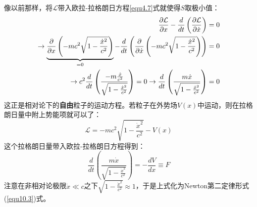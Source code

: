 像以前那样，将$\mathcal{L}$带入欧拉-拉格朗日方程\ref{equ4.7}式就使得$S$取极小值：
\begin{align}
    \frac{\partial \mathcal{L}}{\partial x} - \frac{d}{dt} \left( \frac{\partial \mathcal{L}}{\partial \dot{x}} \right) &= 0 \notag \\
    \to \underbrace{ \frac{\partial}{\partial x} \left( -mc^2 \sqrt{1 - \frac{\dot{x}^2}{c^2}} \right) }_{ = 0} - \frac{d}{dt} \left( \frac{\partial}{\partial \dot{x}} \left( -mc^2 \sqrt{1 - \frac{ \dot{x}^2}{c^2} } \right) \right) &= 0 \notag \\
\label{equ10.9}
    \to c^2 \frac{d}{dt} \left( \frac{ -m \frac{\dot{x}}{c^2} }{\sqrt{1 - \frac{ \dot{x}^2}{c^2} } } \right) = 0 \rightarrow \frac{d}{dt} \left( \frac{m \dot{x}}{\sqrt{1 - \frac{\dot{x}^2}{c^2}}} \right) &= 0
\end{align}
这正是相对论下的{\bf 自由}粒子的运动方程。若粒子在外势场$V(x)$中运动，则在拉格朗日量中附上势能项就可以了：
\begin{equation}
\label{equ10.10}
    \mathcal{L} = -mc^2 \sqrt{1 - \frac{\dot{x}^2}{c^2} } - V(x)
\end{equation}
这个拉格朗日量带入欧拉-拉格朗日方程得到：
\begin{equation}
\label{equ10.11}
    \frac{d}{dt} \left( \frac{m \dot{x}}{ \sqrt{1 - \frac{\dot{x}^2}{c^2} } } \right) = - \frac{dV}{dx} \equiv F
\end{equation}
注意在非相对论极限$\dot{x} \ll c$之下$\sqrt{1 - \frac{\dot{x}^2}{c^2} } \approx 1$，于是上式化为Newton第二定律形式(\ref{equ10.3})式。